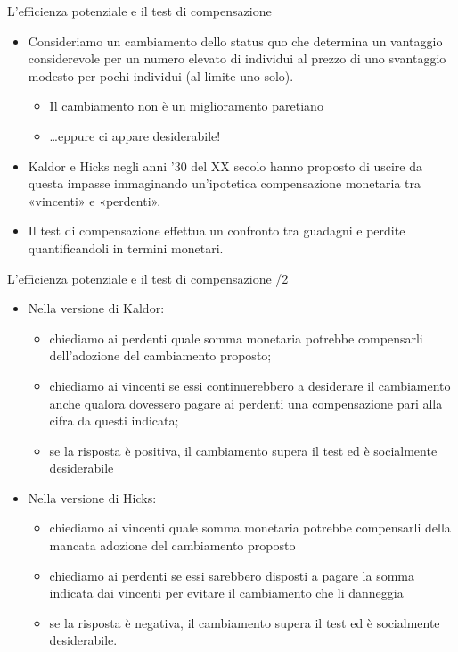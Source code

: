 \documentclass[aspectratio=64,12pt]{beamer}
\begin{document}
\begin{frame}{L'efficienza potenziale e il test di compensazione}
\begin{itemize}
\item Consideriamo un cambiamento dello status quo che determina un vantaggio considerevole per un numero elevato di individui al prezzo di uno svantaggio modesto per pochi individui (al limite uno solo).
\begin{itemize}
\item Il cambiamento non è un miglioramento paretiano
\item \ldots{}eppure ci appare desiderabile!
\end{itemize}
\item Kaldor e Hicks negli anni '30 del XX secolo hanno proposto di uscire da questa impasse immaginando un’ipotetica compensazione monetaria tra «vincenti» e «perdenti».
\item Il test di compensazione effettua un confronto tra guadagni e perdite quantificandoli in termini monetari.
\end{itemize}
\end{frame}


\begin{frame}{L'efficienza potenziale e il test di compensazione /2}
\begin{itemize}
\item Nella versione di Kaldor:
\begin{itemize}
\item chiediamo ai perdenti quale somma monetaria potrebbe compensarli dell’adozione del cambiamento proposto;
\item chiediamo ai vincenti se essi continuerebbero a desiderare il cambiamento anche qualora dovessero pagare ai perdenti una compensazione pari alla cifra da questi indicata;
\item se la risposta è positiva, il cambiamento supera il test ed è socialmente desiderabile
\end{itemize}
\item Nella versione di Hicks:
\begin{itemize}
\item chiediamo ai vincenti quale somma monetaria potrebbe compensarli della mancata adozione del cambiamento proposto
\item chiediamo ai perdenti se essi sarebbero disposti a pagare la somma indicata dai vincenti per evitare il cambiamento che li danneggia
\item se la risposta è \alert{negativa}, il cambiamento supera il test ed è socialmente desiderabile.
\end{itemize}
\end{itemize}
\end{frame}
\end{document}
